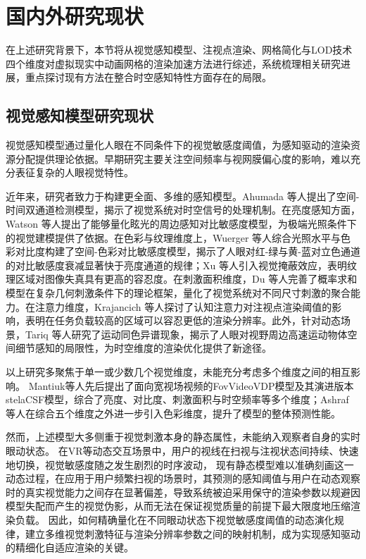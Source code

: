 \section{国内外研究现状}

在上述研究背景下，本节将从视觉感知模型、注视点渲染、网格简化与LOD技术四个维度对虚拟现实中动画网格的渲染加速方法进行综述，系统梳理相关研究进展，重点探讨现有方法在整合时空感知特性方面存在的局限。

\subsection{视觉感知模型研究现状}

视觉感知模型通过量化人眼在不同条件下的视觉敏感度阈值，为感知驱动的渲染资源分配提供理论依据。早期研究主要关注空间频率与视网膜偏心度的影响，难以充分表征复杂的人眼视觉特性\cite{1-2-1, 1-2-1-2}。

近年来，研究者致力于构建更全面、多维的感知模型。Ahumada 等人提出了空间-时间双通道检测模型，揭示了视觉系统对时空信号的处理机制\cite{1-2-1-1}。在亮度感知方面，Watson 等人提出了能够量化眩光\cite{1-2-2-1}的周边感知对比敏感度模型，为极端光照条件下的视觉建模提供了依据\cite{1-2-3}。在色彩与纹理维度上，Wuerger 等人综合光照水平与色彩对比度构建了空间-色彩对比敏感度模型，揭示了人眼对红-绿与黄-蓝对立色通道的对比敏感度衰减显著快于亮度通道的规律\cite{1-2-4}；Xu 等人引入视觉掩蔽效应\cite{1-2-5-1}，表明纹理区域对图像失真具有更高的容忍度\cite{1-2-6}。在刺激面积维度，Du 等人完善了概率求和模型在复杂几何刺激条件下的理论框架，量化了视觉系统对不同尺寸刺激的聚合能力\cite{1-2-6-1}。在注意力维度，Krajancich 等人探讨了认知注意力对注视点渲染阈值的影响，表明在任务负载较高的区域可以容忍更低的渲染分辨率\cite{1-2-6-2}。此外，针对动态场景，Tariq 等人研究了运动同色异谱现象，揭示了人眼对视野周边高速运动物体空间细节感知的局限性，为时空维度的渲染优化提供了新途径\cite{1-2-6-3}。

以上研究多聚焦于单一或少数几个视觉维度，未能充分考虑多个维度之间的相互影响。
Mantiuk等人先后提出了面向宽视场视频的FovVideoVDP模型\cite{1-2-7}及其演进版本stelaCSF模型\cite{1-2-8}，综合了亮度、对比度、刺激面积与时空频率等多个维度；Ashraf 等人在综合五个维度之外进一步引入色彩维度，提升了模型的整体预测性能\cite{1-2-9}。


然而，上述模型大多侧重于视觉刺激本身的静态属性，未能纳入观察者自身的实时眼动状态。
在VR等动态交互场景中，用户的视线在扫视与注视状态间持续、快速地切换，视觉敏感度随之发生剧烈的时序波动\cite{1-2-10}，
现有静态模型难以准确刻画这一动态过程，在应用于用户频繁扫视的场景时，其预测的感知阈值与用户在动态观察时的真实视觉能力之间存在显著偏差，导致系统被迫采用保守的渲染参数以规避因模型失配而产生的视觉伪影，从而无法在保证视觉质量的前提下最大限度地压缩渲染负载。
因此，如何精确量化在不同眼动状态下视觉敏感度阈值的动态演化规律，建立多维视觉刺激特征与渲染分辨率参数之间的映射机制，成为实现感知驱动的精细化自适应渲染的关键。


